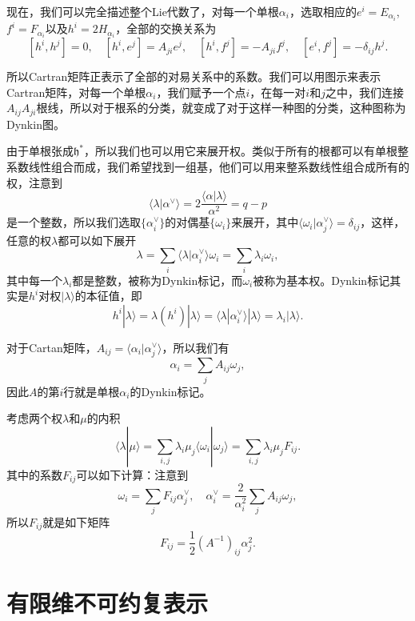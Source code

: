 \documentclass[9pt]{extarticle}
\begin{document}

\para 现在，我们可以完全描述整个Lie代数了，对每一个单根$\alpha_i$，选取相应的$e^i=E_{\alpha_i}$, $f^{i}=F_{\alpha_i}$以及$h^i=2H_{\alpha_i}$，全部的交换关系为
\[
	[h^i,h^j]=0,\quad [h^i,e^j]=A_{ji}e^j,\quad [h^i,f^j]=-A_{ji}f^j,\quad [e^i,f^j]=-\delta_{ij}h^j.
\]

所以Cartran矩阵正表示了全部的对易关系中的系数。我们可以用图示来表示Cartran矩阵，对每一个单根$\alpha_i$，我们赋予一个点$i$，在每一对$i$和$j$之中，我们连接$A_{ij}A_{ji}$根线，所以对于根系的分类，就变成了对于这样一种图的分类，这种图称为Dynkin图。

\para 由于单根张成$\mathfrak{h}^*$，所以我们也可以用它来展开权。类似于所有的根都可以有单根整系数线性组合而成，我们希望找到一组基，他们可以用来整系数线性组合成所有的权，注意到
\[
	\langle\lambda|\alpha^\vee\rangle=2\frac{\langle\alpha|\lambda\rangle}{\alpha^2}=q-p
\]
是一个整数，所以我们选取$\{\alpha_i^\vee\}$的对偶基$\{\omega_i\}$来展开，其中$\langle \omega_i|\alpha_j^\vee\rangle=\delta_{ij}$，这样，任意的权$\lambda$都可以如下展开
\[
	\lambda=\sum_i \langle \lambda|\alpha_i^\vee\rangle \omega_i=\sum_i \lambda_i \omega_i,
\]
其中每一个$\lambda_i$都是整数，被称为Dynkin标记，而$\omega_i$被称为基本权。Dynkin标记其实是$h^i$对权$|\lambda \rangle$的本征值，即
\[
	h^i|\lambda \rangle=\lambda(h^i)|\lambda \rangle=\langle\lambda|\alpha_i^\vee\rangle|\lambda \rangle=\lambda_i|\lambda \rangle.
\]

对于Cartan矩阵，$A_{ij}=\langle \alpha_i|\alpha^\vee_j\rangle$，所以我们有
\[
	\alpha_i=\sum_j A_{ij}\omega_j,
\]
因此$A$的第$i$行就是单根$\alpha_i$的Dynkin标记。

\para 考虑两个权$\lambda$和$\mu$的内积
\[
	\langle \lambda|\mu\rangle=\sum_{i,j}\lambda_i\mu_j\langle \omega_i|\omega_j\rangle=\sum_{i,j}\lambda_i\mu_j F_{ij}.
\]
其中的系数$F_{ij}$可以如下计算：注意到
\[
	\omega_i=\sum_j F_{ij} \alpha_j^\vee,\quad \alpha_i^\vee=\frac{2}{\alpha_i^2}\sum_j A_{ij}\omega_j,
\]
所以$F_{ij}$就是如下矩阵
\[
	F_{ij}=\frac{1}{2}(A^{-1})_{ij}\alpha_j^2.
\]

\section{有限维不可约复表示}
\end{document}
